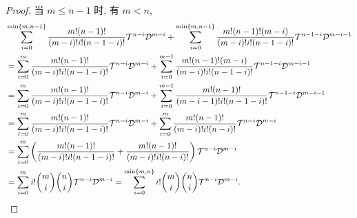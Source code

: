 \documentclass{ctexart}
\begin{document}
\begin{proof}
    当 $m\leq n-1$ 时, 有 $m<n$,
    \begin{align*}
        & \sum\limits_{i=0}^{\min\{m,n-1\}}\dfrac{m!(n-1)!}{(m-i)!i!(n-1-i)!}\mathcal{T}^{n-i}\mathcal{D}^{m-i}+\sum\limits_{i=0}^{\min\{m,n-1\}}\dfrac{m!(n-1)!(m-i)}{(m-i)!i!(n-1-i)!}\mathcal{T}^{n-1-i}\mathcal{D}^{m-i-1} \\
        & =\sum\limits_{i=0}^m\dfrac{m!(n-1)!}{(m-i)!i!(n-1-i)!}\mathcal{T}^{n-i}\mathcal{D}^{m-i}+\sum\limits_{i=0}^{m-1}\dfrac{m!(n-1)!(m-i)}{(m-i)!i!(n-1-i)!}\mathcal{T}^{n-1-i}\mathcal{D}^{m-i-1} \\
        & =\sum\limits_{i=0}^m\dfrac{m!(n-1)!}{(m-i)!i!(n-1-i)!}\mathcal{T}^{n-i}\mathcal{D}^{m-i}+\sum\limits_{i=0}^{m-1}\dfrac{m!(n-1)!}{(m-i-1)!i!(n-1-i)!}\mathcal{T}^{n-1-i}\mathcal{D}^{m-i-1} \\
        & =\sum\limits_{i=0}^m\dfrac{m!(n-1)!}{(m-i)!i!(n-1-i)!}\mathcal{T}^{n-i}\mathcal{D}^{m-i}+\sum\limits_{i=0}^{m}\dfrac{m!(n-1)!}{(m-i)!i!(n-i)!}\mathcal{T}^{n-i}\mathcal{D}^{m-i} \\
        & =\sum\limits_{i=0}^m\left(\dfrac{m!(n-1)!}{(m-i)!i!(n-1-i)!}+\dfrac{m!(n-1)!}{(m-i)!i!(n-i)!}\right)\mathcal{T}^{n-i}\mathcal{D}^{m-i} \\
        & =\sum\limits_{i=0}^mi!\dbinom{m}{i}\dbinom{n}{i}\mathcal{T}^{n-i}\mathcal{D}^{m-i}=\sum\limits_{i=0}^{\min\{m,n\}}i!\dbinom{m}{i}\dbinom{n}{i}\mathcal{T}^{n-i}\mathcal{D}^{m-i}.\qedhere
    \end{align*}
\end{proof}
\end{document}
